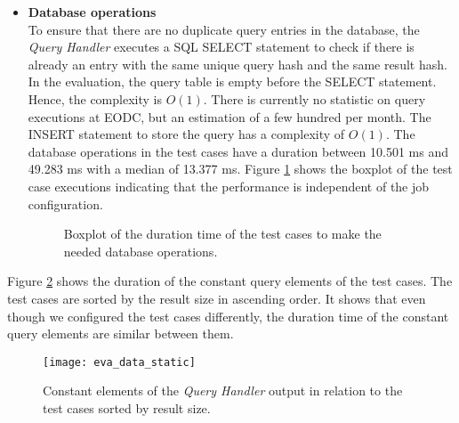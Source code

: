 \documentclass[draft,final]{vutinfth} %
\newcommand{\bgoesswein}[1]{{\color{blue}#1}}
\begin{document}
\begin{itemize}
	\item \textbf{Database operations} \\
	To ensure that there are no duplicate query entries in the database, the \textit{Query Handler} executes a SQL SELECT statement to check if there is already an entry with the same unique query hash and the same result hash. In the evaluation, the query table is empty before the SELECT statement. Hence, the complexity is $O(1)$. \bgoesswein{There is currently no statistic on query executions at EODC, but an estimation of a few hundred per month.} The INSERT statement to store the query has a complexity of $O(1)$. The database operations in the test cases have a duration between 10.501 ms and 49.283 ms with a median of 13.377 ms. Figure \ref{fig:evaluation_perf_data_database} shows the boxplot of the test case executions indicating that the performance is independent of the job configuration.  
	\begin{figure}[!h]
		\centering
		\caption{Boxplot of the duration time of the test cases to make the needed database operations.}
		\label{fig:evaluation_perf_data_database}	
	\end{figure}
\end{itemize}

Figure \ref{fig:eva_data_static} shows the duration of the constant query elements of the test cases. The test cases are sorted by the result size in ascending order. It shows that even though we configured the test cases differently, the duration time of the constant query elements are similar between them. 

\begin{figure}[h]
	\centering
	\texttt{[image: eva\_data\_static]}
	\caption{Constant elements of the \textit{Query Handler} output in relation to the test cases sorted by result size.}
	\label{fig:eva_data_static} %
\end{figure}
\end{document}
